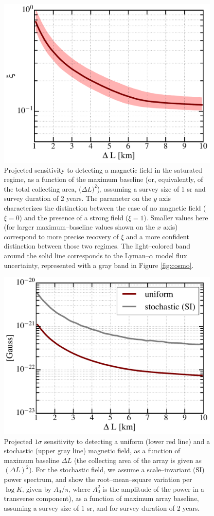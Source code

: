 \begin{figure}
\centering
\includegraphics[width=.35\textwidth,keepaspectratio=true]{xi_vs_deltas.pdf}
\caption{Projected sensitivity to detecting a magnetic field in the saturated regime, as a function of the maximum baseline (or, equivalently, of the total collecting area, ($\Delta L)^2$), assuming a survey size of 1 sr and survey duration of 2 years. The parameter on the $y$ axis characterizes the distinction between the case of no magnetic field ($\xi=0$) and the presence of a strong field ($\xi=1$). Smaller values here (for larger maximum--baseline values shown on the $x$ axis) correspond to more precise recovery of $\xi$ and a more confident distinction between those two regimes. The light--colored band around the solid line corresponds to the Lyman--$\alpha$ model flux uncertainty, represented with a gray band in Figure \ref{fig:cosmo}.\label{fig:xi_vs_deltas}}
\end{figure}
\begin{figure}
\centering
\includegraphics[width=.35\textwidth,keepaspectratio=true]{B_vs_deltas.pdf}
\caption{Projected $1\sigma$ sensitivity to detecting a uniform (lower red line) and a stochastic (upper gray line) magnetic field, as a function of maximum baseline $\Delta L$ (the collecting area of the array is given as $(\Delta L)^2$).  For the stochastic field, we assume a scale--invariant (SI) power spectrum, and show the root--mean--square variation per $\log K$, given by $A_0/\pi$, where $A_0^2$ is the amplitude of the power in a transverse component), as a function of maximum array baseline, assuming a survey size of 1 sr, and for survey duration of 2 years.\label{fig:B_vs_deltas}}
\end{figure}
